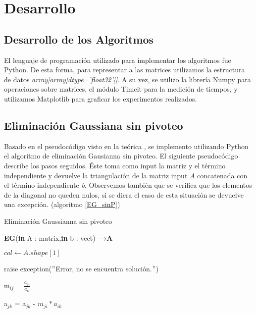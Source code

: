 \section{Desarrollo}
\subsection{Desarrollo de los Algoritmos}

El lenguaje de programación utilizado para implementar los algoritmos fue Python. De esta forma, para representar a las matrices utilizamos la estructura de datos \textit{array[array[dtype='float32']]}. 
A su vez, se utilizo la librería Numpy para operaciones sobre matrices, el módulo Timeit para la medición de tiempos, y utilizamos Matplotlib para graficar los experimentos realizados.

\subsection{Eliminación Gaussiana sin pivoteo}

Basado en el pseudocódigo visto en la teórica \cite{teoEG}, se implemento utilizando Python el algoritmo de eliminación Gausianna sin pivoteo. 
El siguiente pseudocódigo describe los pasos seguidos. Éste toma como input la matriz y el término independiente y devuelve la triangulación de la matriz input \textit{A} concatenada con el término independiente \textit{b}. Observemos también que se verifica que los elementos de la diagonal no queden nulos, si se diera el caso de esta situación se devuelve una excepción. (algoritmo \ref{EG_sinP})


\begin{algorithm}
\caption{Eliminación Gaussianna sin pivoteo}\label{EG_sinP}
\begin{algorithmic}
\State \textbf{EG}(\textbf{in} A : matrix,\textbf{in} b : vect) $\to \textbf{A}$
 
 \State $col \gets A.shape[1]$
 
        \State  raise exception($"$Error, no se encuentra solución.$"$) 
    \EndIf
\EndFor
{}

    \State m$_{ij}$ = $\frac{a_{ji}}{a_{ii}}$
    
        \State a$_{jk}$ = a$_{jk}$ - $m_{ji}*{a_{ik}}$
    \EndFor

\EndFor
\end{algorithmic}
\end{algorithm}

